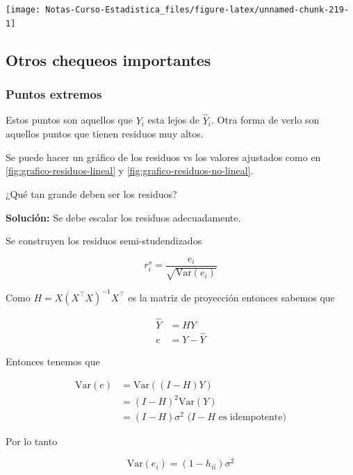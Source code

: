 \documentclass[
  12pt,
]{book}
\theoremstyle{definition}
\theoremstyle{definition}
\theoremstyle{definition}
\theoremstyle{remark}
\begin{document}
\begin{center}\texttt{[image: Notas-Curso-Estadistica\_files/figure-latex/unnamed-chunk-219-1]} \end{center}

\hypertarget{otros-chequeos-importantes}{%
\subsection{Otros chequeos importantes}\label{otros-chequeos-importantes}}

\hypertarget{puntos-extremos}{%
\subsubsection{Puntos extremos}\label{puntos-extremos}}

Estos puntos son aquellos que \(Y_i\) esta lejos de \(\hat{Y}_i\). Otra forma de verlo son aquellos puntos que tienen residuos muy altos.

Se puede hacer un gráfico de los residuos vs los valores ajustados como en \ref{fig:grafico-residuos-lineal} y \ref{fig:grafico-residuos-no-lineal}.

¿Qué tan grande deben ser los residuos?

\textbf{Solución:} Se debe escalar los residuos adecuadamente.

Se construyen los residuos semi-studendizados

\begin{equation*}
r_{i}^{s} = \frac{e_{i}}{\sqrt{\mathrm{Var}\left(e_{i}\right)}} 
\end{equation*}

Como \(H=X(X^{\top}X)^{-1}X^{\top}\) es la matriz de proyección entonces sabemos que

\begin{align*}
\hat{Y}&=  H Y \\
e &= Y - \hat{Y}  
\end{align*}

Entonces tenemos que

\begin{align*}
\mathrm{Var}\left(e\right) 
&=  \mathrm{Var}\left((I-H)Y\right)\\
&= (I-H)^{2}\mathrm{Var}\left(Y\right)\\
&= (I-H) \sigma^{2} \text{ (\(I-H\) es idempotente)}
\end{align*}

Por lo tanto

\begin{equation*}
\mathrm{Var}\left(e_{i}\right) = (1-h_{ii}) \sigma^{2}
\end{equation*}
\end{document}
